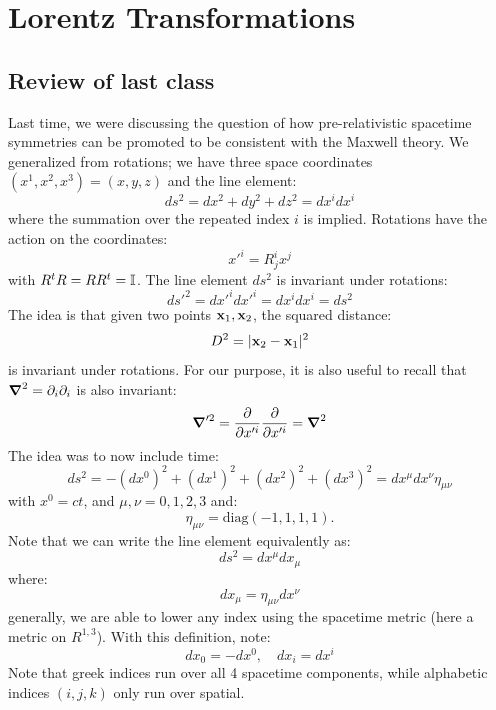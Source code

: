 \section{Lorentz Transformations}

\subsection{Review of last class}
Last time, we were discussing the question of how pre-relativistic spacetime symmetries can be promoted to be consistent with the Maxwell theory. We generalized from rotations; we have three space coordinates $(x^1, x^2, x^3) = (x, y, z)$ and the line element:
\begin{equation}
    ds^2 = dx^2 + dy^2 + dz^2 = dx^idx^i
\end{equation}
where the summation over the repeated index $i$ is implied. Rotations have the action on the coordinates:
\begin{equation}
    x'^i = R^i_j x^j
\end{equation}
with $R^tR = RR^t = \mathbb{I}$. The line element $ds^2$ is invariant under rotations:
\begin{equation}
    ds'^2 = dx'^i dx'^i = dx^i dx^i = ds^2
\end{equation}
The idea is that given two points $\mathbf{x}_1, \mathbf{x}_2$, the squared distance:
\begin{equation}
    D^2 = \lvert \mathbf{x}_2 - \mathbf{x}_1 \rvert^2
\end{equation}
is invariant under rotations. For our purpose, it is also useful to recall that $\nabla^2 = \p_i \p_i$ is also invariant:
\begin{equation}
    \nabla'^2 = \ddpd{}{x'^i}\ddpd{}{x'^i} = \nabla^2
\end{equation}
The idea was to now include time:
\begin{equation}
    ds^2 = -(dx^0)^2 + (dx^1)^2 + (dx^2)^2 + (dx^3)^2 = dx^\mu dx^\nu \eta_{\mu\nu}
\end{equation}
with $x^0 = ct$, and $\mu, \nu = 0, 1, 2, 3$ and:
\begin{equation}
    \eta_{\mu\nu} = \text{diag}(-1, 1, 1, 1).
\end{equation}
Note that we can write the line element equivalently as:
\begin{equation}
    ds^2 = dx^\mu dx_\mu
\end{equation}
where:
\begin{equation}
    dx_\mu = \eta_{\mu\nu}dx^\nu
\end{equation}
generally, we are able to lower any index using the spacetime metric (here a metric on $R^{1, 3}$). With this definition, note:
\begin{equation}
    dx_0 = -dx^0, \quad dx_i = dx^i
\end{equation}
Note that greek indices run over all 4 spacetime components, while alphabetic indices $(i, j, k)$ only run over spatial.

